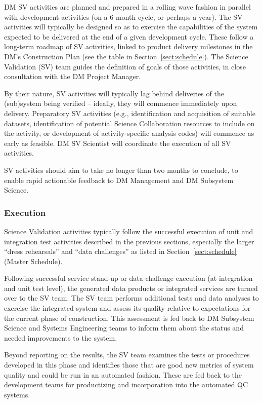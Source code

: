 DM SV activities are planned and prepared in a rolling wave fashion in
parallel with development activities (on a 6-month cycle, or perhaps a
year). The SV activities will typically be designed so as to exercise the
capabilities of the system expected to be delivered at the end of a given
development cycle. These follow a long-term roadmap of SV activities,
linked to product delivery milestones in the DM's Construction Plan (see
the table in Section~\ref{sect:schedule}).  The Science Validation (SV) team
guides the definition of goals of those activities, in close consultation
with the DM Project Manager.

By their nature, SV activities will typically lag behind
deliveries of the (sub)system being verified -- ideally, they will commence
immediately upon delivery. Preparatory SV activities (e.g., identification and
acquisition of suitable datasets, identification of potential Science
Collaboration resources to include on the activity, or development of
activity-specific analysis codes) will commence as early as feasible. DM SV
Scientist will coordinate the execution of all SV activities.

SV activities should aim to take no longer than two months to conclude, to
enable rapid actionable feedback to DM Management and DM Subsystem Science.

\subsubsection{Execution}

Science Validation activities typically follow the successful execution of
unit and integration test activities described in the previous sections,
especially the larger ``dress rehearsals'' and ``data challenges'' as
listed in Section~\ref{sect:schedule} (Master Schedule).

Following successful service stand-up or data challenge execution (at
integration and unit test level), the generated data products or integrated
services are turned over to the SV team.  The SV team performs additional
tests and data analyses to exercise the integrated system and assess its
quality relative to expectations for the current phase of construction.
This assessment is fed back to DM Subsystem Science and Systems Engineering
teams to inform them about the status and needed improvements to the system.

Beyond reporting on the results, the SV team examines the tests or
procedures developed in this phase and identifies those that are good new
metrics of system quality and could be run in an automated fashion.  These
are fed back to the development teams for productizing and incorporation
into the automated QC systems.

